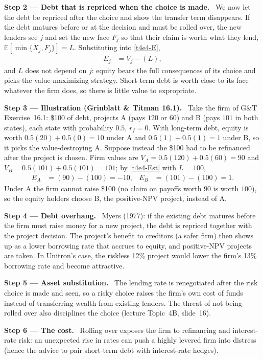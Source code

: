 \documentclass[11pt,a4paper]{article}
\newcommand{\step}[2]{\par\medskip\noindent\textbf{Step #1 --- #2.}~}
\begin{document}
\step{2}{Debt that is repriced when the choice is made} We now let the debt be repriced after the
choice and show the transfer term disappears. If the debt matures before or at the
decision and must be rolled over, the new lenders see $j$ and set the new face $F_j$ so that
their claim is worth what they lend, $\mathbb{E}[\min\{X_j,F_j\}]=L$. Substituting into
\eqref{t4e4-E},
\begin{align}
  E_j &= V_j-(L), \label{t4e4-Est}
\end{align}
and $L$ does not depend on $j$: equity bears the full consequences of its choice and picks
the value-maximizing strategy. Short-term debt is worth close to its face whatever the firm
does, so there is little value to expropriate.

\step{3}{Illustration (Grinblatt \& Titman 16.1)} Take the firm of G\&T Exercise~16.1: \$100 of
debt, projects A (pays $120$ or $60$) and B (pays $101$ in both states), each state with
probability $0.5$, $r_f=0$. With long-term debt, equity is worth $0.5(20)+0.5(0)=10$ under A and
$0.5(1)+0.5(1)=1$ under B, so it picks the value-destroying A. Suppose instead the \$100 had to be
refinanced after the project is chosen. Firm values are
$V_A=0.5(120)+0.5(60)=90$ and $V_B=0.5(101)+0.5(101)=101$; by \eqref{t4e4-Est} with $L=100$,
\begin{align}
  E_A &= (90)-(100) = -10, & E_B &= (101)-(100) = 1. \nonumber
\end{align}
Under A the firm cannot raise \$100 (no claim on payoffs worth $90$ is worth $100$), so the
equity holders choose B, the positive-NPV project, instead of A.

\step{4}{Debt overhang} Myers (1977): if the existing debt matures before the firm must raise
money for a new project, the debt is repriced together with the project decision. The
project's benefit to creditors (a safer firm) then shows up as a lower borrowing rate that
accrues to equity, and positive-NPV projects are taken. In Unitron's case, the riskless
12\% project would lower the firm's 13\% borrowing rate and become attractive.

\step{5}{Asset substitution} The lending rate is renegotiated after the risk choice is made and
seen, so a risky choice raises the firm's own cost of funds instead of transferring wealth
from existing lenders. The threat of not being rolled over also disciplines the choice (lecture
Topic~4B, slide~16).

\step{6}{The cost} Rolling over exposes the firm to refinancing and interest-rate risk: an
unexpected rise in rates can push a highly levered firm into distress (hence the advice to
pair short-term debt with interest-rate hedges).
\end{document}
